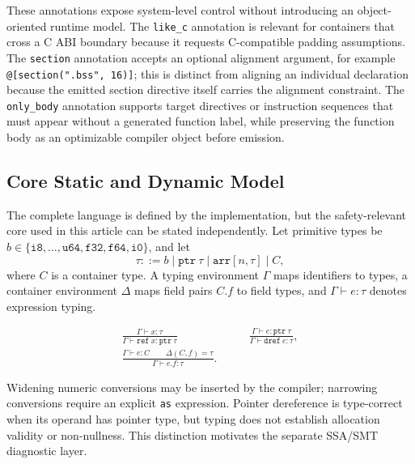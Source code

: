 \documentclass[10pt,twocolumn]{article}
\begin{document}
\par These annotations expose system-level control without introducing an object-oriented runtime model. The \texttt{like\_c} annotation is relevant for containers that cross a C ABI boundary because it requests C-compatible padding assumptions. The \texttt{section} annotation accepts an optional alignment argument, for example \texttt{@[section(".bss", 16)]}; this is distinct from aligning an individual declaration because the emitted section directive itself carries the alignment constraint. The \texttt{only\_body} annotation supports target directives or instruction sequences that must appear without a generated function label, while preserving the function body as an optimizable compiler object before emission.

\subsection{Core Static and Dynamic Model}
\label{sec:formal-core}

\par The complete language is defined by the implementation, but the safety-relevant core used in this article can be stated independently. Let primitive types be \(b \in \{\texttt{i8},\ldots,\texttt{u64},\texttt{f32},\texttt{f64},\texttt{i0}\}\), and let
\[
\tau ::= b \mid \texttt{ptr}\ \tau \mid \texttt{arr}[n,\tau] \mid C,
\]
where \(C\) is a container type. A typing environment \(\Gamma\) maps identifiers to types, a container environment \(\Delta\) maps field pairs \(C.f\) to field types, and \(\Gamma \vdash e : \tau\) denotes expression typing.

\begin{align*}
\frac{\Gamma \vdash x : \tau}
     {\Gamma \vdash \texttt{ref}\ x : \texttt{ptr}\ \tau}
&\qquad
\frac{\Gamma \vdash e : \texttt{ptr}\ \tau}
     {\Gamma \vdash \texttt{dref}\ e : \tau},
\\[0.5em]
\frac{\Gamma \vdash e : C \qquad \Delta(C,f)=\tau}
     {\Gamma \vdash e.f : \tau}.&
\end{align*}

\par Widening numeric conversions may be inserted by the compiler; narrowing conversions require an explicit \texttt{as} expression. Pointer dereference is type-correct when its operand has pointer type, but typing does not establish allocation validity or non-nullness. This distinction motivates the separate SSA/SMT diagnostic layer.
\end{document}
